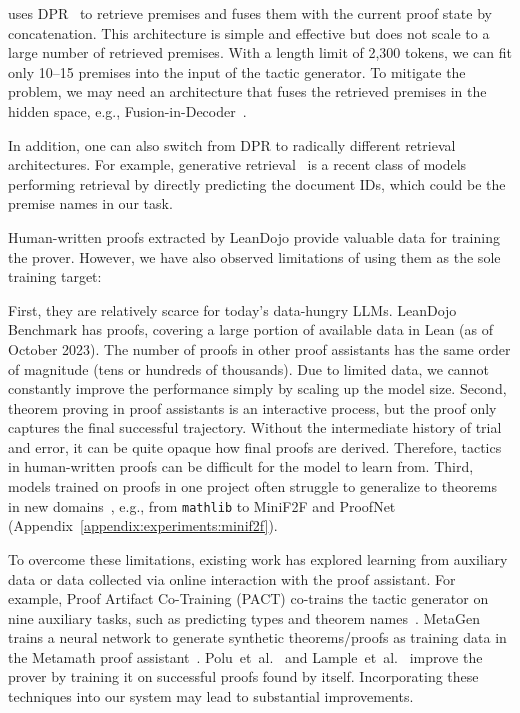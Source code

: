 {\name} uses DPR~\cite{karpukhin2020dense} to retrieve premises and fuses them with the current proof state by concatenation. This architecture is simple and effective but does not scale to a large number of retrieved premises. With a length limit of 2,300 tokens, we can fit only 10--15 premises into the input of the tactic generator. To mitigate the problem, we may need an architecture that fuses the retrieved premises in the hidden space, e.g., Fusion-in-Decoder~\cite{izacard2021leveraging}.

In addition, one can also switch from DPR to radically different retrieval architectures. For example, generative retrieval~\cite{tay2022transformer,bevilacqua2022autoregressive,pradeep2023does} is a recent class of models performing retrieval by directly predicting the document IDs, which could be the premise names in our task.


Human-written proofs extracted by LeanDojo provide valuable data for training the prover. However, we have also observed limitations of using them as the sole training target:

First, they are relatively scarce for today's data-hungry LLMs. LeanDojo Benchmark has {\numproofs} proofs, covering a large portion of available data in Lean (as of October 2023). The number of proofs in other proof assistants has the same order of magnitude (tens or hundreds of thousands). Due to limited data, we cannot constantly improve the performance simply by scaling up the model size. Second, theorem proving in proof assistants is an interactive process, but the proof only captures the final successful trajectory. Without the intermediate history of trial and error, it can be quite opaque how final proofs are derived. Therefore, tactics in human-written proofs can be difficult for the model to learn from. Third, models trained on proofs in one project often struggle to generalize to theorems in new domains~\cite{yang2019learning,first2023baldur}, e.g., from \texttt{mathlib} to MiniF2F and ProofNet (Appendix~\ref{appendix:experiments:minif2f}).


To overcome these limitations, existing work has explored learning from auxiliary data or data collected via online interaction with the proof assistant. For example, Proof Artifact Co-Training (PACT) co-trains the tactic generator on nine auxiliary tasks, such as predicting types and theorem names~\cite{han2022proof}. MetaGen~\cite{wang2020learning} trains a neural network to generate synthetic theorems/proofs as training data in the Metamath proof assistant~\cite{megill2019metamath}. Polu~et~al.~\cite{polu2023formal} and Lample~et~al.~\cite{lample2022hypertree} improve the prover by training it on successful proofs found by itself. Incorporating these techniques into our system may lead to substantial improvements.



